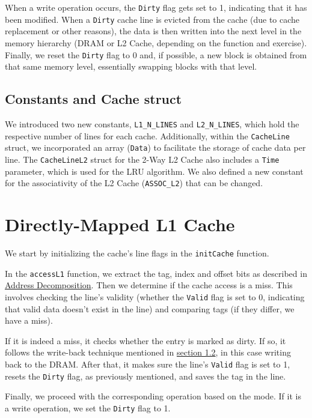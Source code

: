 \documentclass[12pt]{article}
\begin{document}
    \vskip -0.3cm
    When a write operation occurs, the \texttt{Dirty} flag gets set to 1, indicating that it has been modified.
    When a \texttt{Dirty} cache line is evicted from the cache (due to cache replacement or other reasons),
    the data is then written into the next level in the memory hierarchy (DRAM or L2 Cache, depending on the function and exercise).
    Finally, we reset the \texttt{Dirty} flag to 0 and, if possible, a new block is obtained from that same memory level, essentially swapping blocks with that level.

    \subsection{Constants and Cache struct}
    We introduced two new constants, \texttt{L1\_N\_LINES} and \texttt{L2\_N\_LINES}, which hold the respective number of lines for each cache.
    Additionally, within the \texttt{CacheLine} struct, we incorporated an array (\texttt{Data}) to facilitate the storage of cache data per line.
    The \texttt{CacheLineL2} struct for the 2-Way L2 Cache also includes a \texttt{Time} parameter, which is used for the LRU algorithm.
    We also defined a new constant for the associativity of the L2 Cache (\texttt{ASSOC\_L2}) that can be changed.

    \section{Directly-Mapped L1 Cache} \label{S2}

    We start by initializing the cache's line flags in the \texttt{initCache} function.

    In the \texttt{accessL1} function, we extract the tag, index and offset bits as described in \hyperref[AD]{Address Decomposition}. Then we determine if the
    cache access is a miss. This involves checking the line's validity (whether the \texttt{Valid} flag is set to 0, indicating that valid data doesn't exist in the line)
    and comparing tags (if they differ, we have a miss).

    If it is indeed a miss, it checks whether the entry is marked as dirty. If so, it follows the write-back technique mentioned in \hyperref[WBT]{section 1.2}, in
    this case writing back to the DRAM. After that, it makes sure the line's \texttt{Valid} flag is set to 1, resets the \texttt{Dirty} flag, as previously mentioned, and saves
    the tag in the line.

    Finally, we proceed with the corresponding operation based on the mode. If it is a write operation, we set the \texttt{Dirty} flag to 1.
\end{document}
